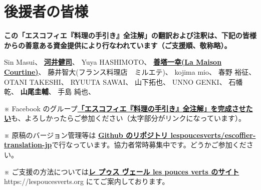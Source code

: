 \hypertarget{benefactors}{%
\section{後援者の皆様}\label{benefactors}}

\thispagestyle{empty}

\small

\textbf{この「エスコフィエ『料理の手引き』全注解」の翻訳および注釈は、下記の皆様からの善意ある資金提供により行なわれています（ご支援順、敬称略）。}

\normalsize
\vspace{1\zw}

Sin Masui、\href{20180524-23h,2x,novelsoundsmail@gmail.com}{}
\href{http://www.undecesjours.com/}{\textbf{河井健司}}、\href{20180525-0h14,10x,20180605-11h42,10x,kwibeng@gmail.com}{}
Yuya HASHIMOTO、\href{20180525-1h40,2x,hashimo0910@gmail.com}{}
\href{http://www.courtine.jp/}{\textbf{善塔一幸(La Maison
Courtine)}}、\href{20180525-8h56,10x,kazuyukizento120@docomo.ne.jp}{}
藤井智大(フランス料理店　ミルエテ)、\href{20180525-10h07,1x,apple19761019@yahoo.co.jp}{}
kojima mio、\href{20180525-12h23,1x,teeeeshow@yahoo.co.jp}{} 春野
裕征、\href{20180528-2h41,1x,amanojack.v-o-v@i.softbank.jp}{} OTANI
TAKESHI、\href{20180529-17h26,2x,1000feuille@ezweb.ne.jp}{} RYUUTA
SAWAI、\href{20180530-2h57.1x,rs.ajtk.zz@i.softbank.jp}{}
山下拓也、\href{20180605-11h04,5x,FB:Takuya\%20Yamashita}{} UNNO
GENKI、\href{20180605-22h12,1x,guriiva@aol.com}{}
石幡乾、\href{201806060-6h24,1x,zonek.gentile.bonheur.ken05@gmail.com}{}
\textbf{山尾圭輔}、\href{20180612-10h27,20x,yamaokeisuke@hotmail.com}{}
手島 純也、\href{20180612-19h19,1x,junchef1975@yahoo.co.jp}{}

\vfill

\small

※ Facebook
のグループ\href{https://www.facebook.com/groups/1548833425201180/}{\textbf{「エスコフィエ『料理の手引き』全注解」を完成させたい}}も、よろしかったらご参加ください（太字部分がリンクになっています）。

※ 原稿のバージョン管理等は
\href{https://github.com/lespoucesverts/escoffier-translation-jp}{\textbf{Github
のリポジトリ
lespoucesverts/escoffier-translation-jp}}で行なっています。協力者常時募集中です。どうかご参加ください。

※
ご支援の方法については\href{https://lespoucesverts.org/archives/7042}{\textbf{レ
プゥス ヴェール les pouces verts のサイト}} https://lespoucesverts.org
にてご案内しております。

\normalsize
